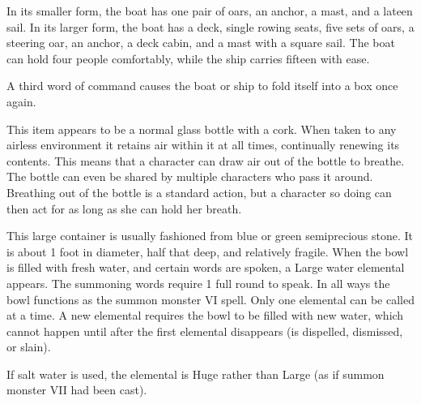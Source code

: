 {In its smaller form, the boat has one pair of oars, an anchor, a mast, and a lateen sail. In its larger form, the boat has a deck, single rowing seats, five sets of oars, a steering oar, an anchor, a deck cabin, and a mast with a square sail. The boat can hold four people comfortably, while the ship carries fifteen with ease.

A third word of command causes the boat or ship to fold itself into a box once again.


 This item appears to be a normal glass bottle with a cork. When taken to any airless environment it retains air within it at all times, continually renewing its contents. This means that a character can draw air out of the bottle to breathe. The bottle can even be shared by multiple characters who pass it around. Breathing out of the bottle is a standard action, but a character so doing can then act for as long as she can hold her breath.


 This large container is usually fashioned from blue or green semiprecious stone. It is about 1 foot in diameter, half that deep, and relatively fragile. When the bowl is filled with fresh water, and certain words are spoken, a Large water elemental appears. The summoning words require 1 full round to speak. In all ways the bowl functions as the summon monster VI spell. Only one elemental can be called at a time. A new elemental requires the bowl to be filled with new water, which cannot happen until after the first elemental disappears (is dispelled, dismissed, or slain).

If salt water is used, the elemental is Huge rather than Large (as if summon monster VII had been cast).


}
